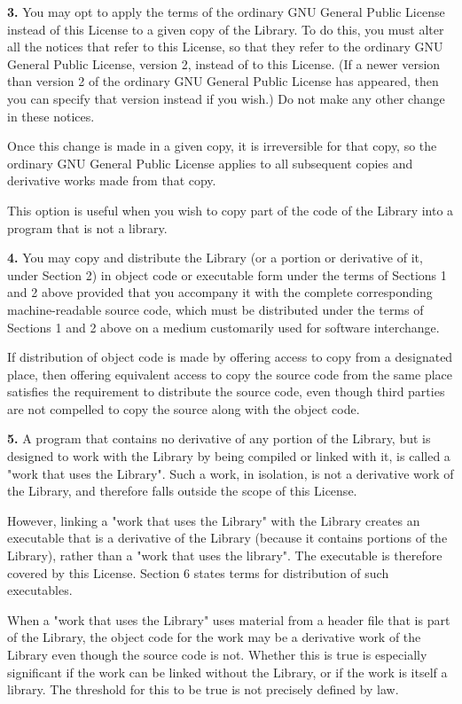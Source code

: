 {\bf 3.} You may opt to apply the terms of the ordinary GNU General Public
License instead of this License to a given copy of the Library. To do this,
you must alter all the notices that refer to this License, so that they refer
to the ordinary GNU General Public License, version 2, instead of to this
License. (If a newer version than version 2 of the ordinary GNU General Public
License has appeared, then you can specify that version instead if you wish.)
Do not make any other change in these notices.

Once this change is made in a given copy, it is irreversible for that copy, so
the ordinary GNU General Public License applies to all subsequent copies and
derivative works made from that copy.

This option is useful when you wish to copy part of the code of the Library
into a program that is not a library.

{\bf 4.} You may copy and distribute the Library (or a portion or derivative
of it, under Section 2) in object code or executable form under the terms of
Sections 1 and 2 above provided that you accompany it with the complete
corresponding machine-readable source code, which must be distributed under
the terms of Sections 1 and 2 above on a medium customarily used for software
interchange.

If distribution of object code is made by offering access to copy from a
designated place, then offering equivalent access to copy the source code from
the same place satisfies the requirement to distribute the source code, even
though third parties are not compelled to copy the source along with the
object code.

{\bf 5.} A program that contains no derivative of any portion of the Library,
but is designed to work with the Library by being compiled or linked with it,
is called a "work that uses the Library". Such a work, in isolation, is not
a derivative work of the Library, and therefore falls outside the scope of
this License.

However, linking a "work that uses the Library" with the Library creates an
executable that is a derivative of the Library (because it contains portions
of the Library), rather than a "work that uses the library". The executable
is therefore covered by this License. Section 6 states terms for distribution
of such executables.

When a "work that uses the Library" uses material from a header file that is
part of the Library, the object code for the work may be a derivative work of
the Library even though the source code is not. Whether this is true is
especially significant if the work can be linked without the Library, or if
the work is itself a library. The threshold for this to be true is not
precisely defined by law.

